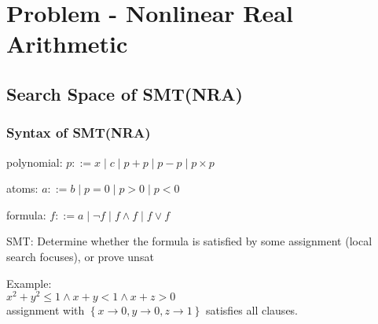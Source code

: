 \frame[plain]{\titlepage}

\section{Problem - Nonlinear Real Arithmetic}
\subsection{Search Space of SMT(NRA)}

\begin{frame}
    \frametitle{Syntax of SMT(NRA)}
    
    polynomial: $p ::= x \mid c \mid p + p \mid p - p \mid p \times p$

    atoms: $a ::= b \mid p = 0 \mid p > 0 \mid p < 0$

    formula: $f ::= a \mid \neg f \mid f \wedge f \mid f \vee f $

    \vspace{0.4cm}

    SMT: Determine whether the formula is satisfied by some assignment (local search focuses), or prove unsat

    \vspace{0.4cm}

    Example:
    \\
    $x^2 + y^2 \le 1 \wedge x + y < 1 \wedge x + z > 0$
    \\
    assignment with $\left\{x \rightarrow 0, y \rightarrow 0, z \rightarrow 1\right\}$ satisfies all clauses.
\end{frame}

